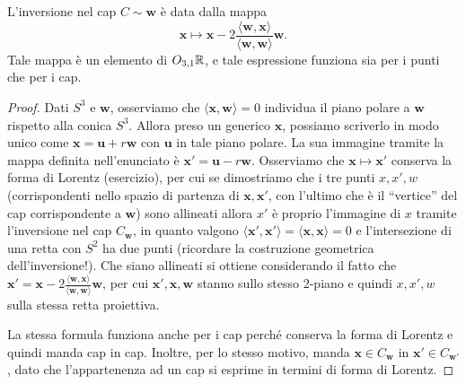 \begin{teorema}
	L'inversione nel cap $C\sim \mathbf w$ è data dalla mappa
	$$\mathbf x\mapsto\mathbf x - 2 \frac{\langle \mathbf w, \mathbf x\rangle}{\langle \mathbf w, \mathbf w\rangle}\mathbf w.$$
	Tale mappa è un elemento di $O_{3,1}\mathbb{R}$, e tale espressione funziona sia per i punti che per i cap.
\end{teorema}
\begin{proof}
	Dati $S^{3}$ e $\mathbf w$, osserviamo che $\langle \mathbf x,\mathbf w\rangle = 0$ individua il piano polare a $\mathbf w$ rispetto alla conica $S^{3}$. 
	Allora preso un generico $\mathbf x$, possiamo scriverlo in modo unico come $\mathbf x = \mathbf u + r\mathbf w$ con $\mathbf u$ in tale piano polare. La sua immagine tramite la mappa definita nell'enunciato è $\mathbf x' = \mathbf u-r\mathbf w$. 
	Osserviamo che $\mathbf x\mapsto\mathbf x'$ conserva la forma di Lorentz (esercizio), per cui se dimostriamo che i tre punti $x,x',w$ (corrispondenti nello spazio di partenza di $\mathbf x,\mathbf x'$, con l'ultimo che è il ``vertice'' del cap corrispondente a $\mathbf w$) sono allineati allora $x'$ è proprio l'immagine di $x$ tramite l'inversione nel cap $C_{\mathbf w}$, in quanto valgono $\langle \mathbf x',\mathbf x'\rangle = \langle \mathbf x,\mathbf x\rangle = 0$ e l'intersezione di una retta con $S^{2}$ ha due punti (ricordare la costruzione geometrica dell'inversione!). 
	Che siano allineati si ottiene considerando il fatto che $\mathbf x' = \mathbf x - 2 \frac{\langle \mathbf w, \mathbf x\rangle}{\langle \mathbf w, \mathbf w\rangle}\mathbf w$, per cui $\mathbf x',\mathbf x,\mathbf w$ stanno sullo stesso 2-piano e quindi $x,x',w$ sulla stessa retta proiettiva.
	
	La stessa formula funziona anche per i cap perché conserva la forma di Lorentz e quindi manda cap in cap. Inoltre, per lo stesso motivo, manda $\mathbf x\in C_{\mathbf w}$ in $\mathbf x'\in C_{\mathbf w'}$, dato che l'appartenenza ad un cap si esprime in termini di forma di Lorentz.
\end{proof}


